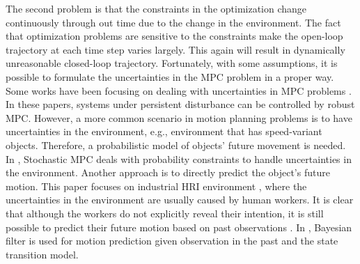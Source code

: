 \documentclass[letterpaper, 10 pt, conference]{ieeeconf}  %
\begin{document}

The second problem is that the constraints in the optimization change continuously through out time due to the change in the environment. The fact that optimization problems are sensitive to the constraints make the open-loop trajectory at each time step varies largely. This again will result in dynamically unreasonable closed-loop trajectory. Fortunately, with some assumptions, it is possible to formulate the uncertainties in the MPC problem in a proper way. Some works have been focusing on dealing with uncertainties in MPC problems  \cite{ chisci2001systems, kuwata2007distributed}. In these papers, systems under persistent disturbance can be controlled by robust MPC. However, a more common scenario in motion planning problems is to have uncertainties in the environment, e.g., environment that has speed-variant objects. Therefore, a probabilistic model of objects' future movement is needed. In \cite{luders2010chance}, Stochastic MPC deals with probability constraints to handle uncertainties in the environment. Another approach is to directly predict the object's future motion. This paper focuses on industrial HRI environment \cite{goodrich2008human, kruse2013human}, where the uncertainties in the environment are usually caused by human workers. It is clear that although the workers do not explicitly reveal their intention, it is still possible to predict their future motion based on past observations \cite{butepage2017anticipating}. In \cite{kumar2013learning}, Bayesian filter is used for motion prediction given observation in the past and the state transition model. 
\end{document}
